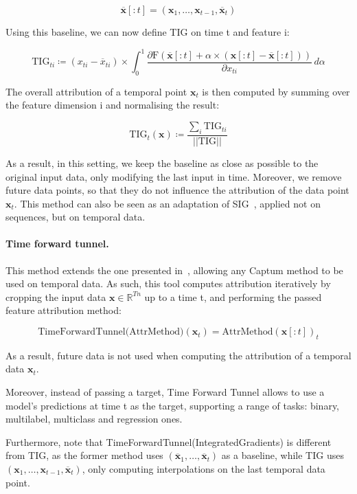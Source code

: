\[ \overline{\textbf{x}}[:t] = (\textbf{x}_1, \dots, \textbf{x}_{t-1}, \overline{\textbf{x}}_t) \]

Using this baseline, we can now define TIG on time t and feature i:

\begin{equation}
    \textrm{TIG}_{ti} \coloneqq  (x_{ti} - \overline{x}_{ti}) \times
    \int_0^1 \frac{\partial \textrm{F}(\overline{\textbf{x}}[:t] + \alpha \times (\textbf{x}[:t] -
    \overline{\textbf{x}}[:t]))}{\partial x_{ti}} \, d\alpha
    \label{eq:tig}
\end{equation}

The overall attribution of a temporal point $\textbf{x}_t$ is then computed by summing over the feature dimension i and
normalising the result:

\[ \textrm{TIG}_t(\textbf{x}) \coloneqq \frac{\sum_i \textrm{TIG}_{ti}}{||\textrm{TIG}||} \]

As a result, in this setting, we keep the baseline as close as possible to the original input data, only modifying the
last input in time.
Moreover, we remove future data points, so that they do not influence the attribution of the data point $\textbf{x}_t$.
This method can also be seen as an adaptation of SIG~\citep{enguehard2023sequential}, applied not on sequences, but on
temporal data.


\paragraph{Time forward tunnel.}

This method extends the one presented in~\citep{tonekaboni2020went}, allowing any Captum method to be used on temporal
data.
As such, this tool computes attribution iteratively by cropping the input data $\textbf{x} \in \mathbb{R}^{Tn}$ up to
a time t, and performing the passed feature attribution method:

\[ \textrm{TimeForwardTunnel(AttrMethod)}(\textbf{x}_t) = \textrm{AttrMethod}(\textbf{x}[:t])_t \]

As a result, future data is not used when computing the attribution of a temporal data $\textbf{x}_t$.

Moreover, instead of passing a target, Time Forward Tunnel allows to use a model's predictions at time t as the target,
supporting a range of tasks: binary, multilabel, multiclass and regression ones.

Furthermore, note that TimeForwardTunnel(IntegratedGradients) is different from TIG, as the former method uses
$(\overline{\textbf{x}}_1, \dots, \overline{\textbf{x}}_t)$ as a baseline, while TIG uses
$(\textbf{x}_1, \dots, \textbf{x}_{t-1}, \overline{\textbf{x}}_t)$,
only computing interpolations on the last temporal data point.


